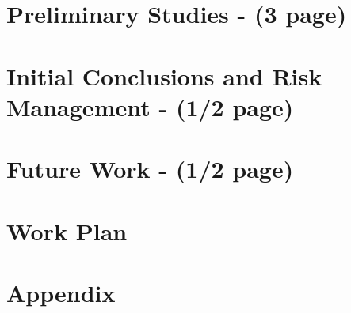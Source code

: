 \documentclass[11pt]{article}
\begin{document}
\section{Preliminary Studies - (3 page)}

\section{Initial Conclusions and Risk Management - (1/2 page)}

\section{Future Work - (1/2 page)}

\section{Work Plan}



\section*{Appendix}
\end{document}
